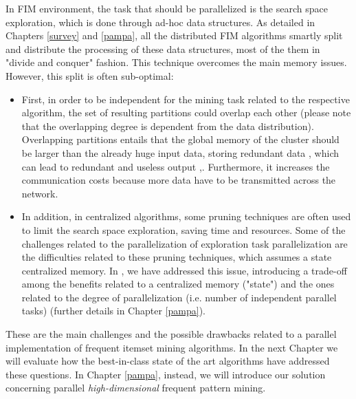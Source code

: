 In FIM environment, the task that should be parallelized is the search space exploration, which is done through ad-hoc data structures. As detailed in Chapters \ref{survey} and \ref{pampa}, all the distributed FIM algorithms smartly split and distribute the processing of these data structures, most of the them in "divide and conquer" fashion. This technique overcomes the main memory issues.
However, this split is often sub-optimal:
\begin{itemize}
\item First, in order to be independent for the mining task related to the respective algorithm, the set of resulting partitions could overlap each other (please note that the overlapping degree is dependent from the data distribution). Overlapping partitions entails that the global memory of the cluster should be larger than the already huge input data, storing redundant data \cite{Mahout},\cite{pampa_v1} which can lead to redundant and useless output \cite{bigfim},\cite{pampa_v1}. Furthermore, it increases the communication costs because more data have to be transmitted across the network.

\item In addition, in centralized algorithms, some pruning techniques are often used to limit the search space exploration, saving time and resources. Some of the challenges related to the parallelization of exploration task parallelization are the difficulties related to these pruning techniques, which assumes a state centralized memory. In \cite{pampa_v1}, we have addressed this issue, introducing a trade-off among the benefits related to a centralized memory ("state") and the ones related to the degree of parallelization (i.e. number of independent parallel tasks) (further details in Chapter \ref{pampa}).
\end{itemize}

These are the main challenges and the possible drawbacks related 
to a parallel implementation of frequent itemset mining algorithms. 
In the next Chapter we will evaluate how the best-in-class state of the art algorithms have addressed these questions. In Chapter \ref{pampa}, instead, we will introduce our solution concerning parallel \textit{high-dimensional} frequent pattern mining. 

